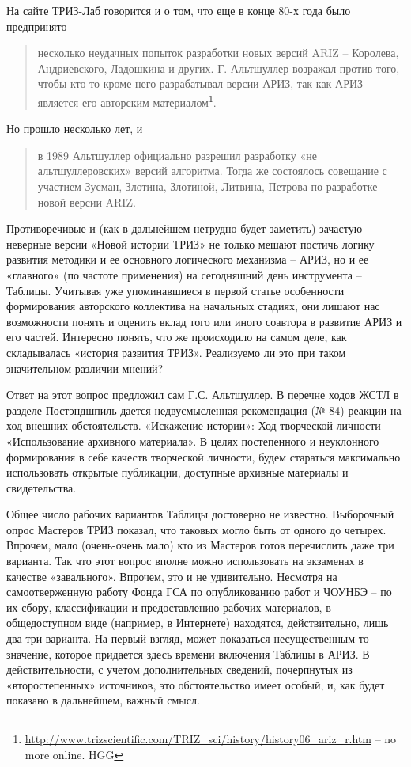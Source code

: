 \documentclass[11pt,a4paper]{article}
\begin{document}
На сайте ТРИЗ-Лаб говорится и о том, что еще в конце 80-х года было
предпринято 
\begin{quote}
  несколько неудачных попыток разработки новых версий ARIZ -- Королева,
  Андриевского, Ладошкина и других. Г. Альтшуллер возражал против того, чтобы
  кто-то кроме него разрабатывал версии АРИЗ, так как АРИЗ является его
  авторским
  материалом\footnote{\url{http://www.trizscientific.com/TRIZ_sci/history/history06_ariz_r.htm}
    -- no more online. HGG}.
\end{quote}
Но прошло несколько лет, и 
\begin{quote}
  в 1989 Альтшуллер официально разрешил разработку «не альтшуллеровских»
  версий алгоритма. Тогда же состоялось совещание с участием Зусман, Злотина,
  Злотиной, Литвина, Петрова по разработке новой версии ARIZ.
\end{quote}

Противоречивые и (как в дальнейшем нетрудно будет заметить) зачастую неверные
версии «Новой истории ТРИЗ» не только мешают постичь логику развития методики
и ее основного логического механизма -- АРИЗ, но и ее «главного» (по частоте
применения) на сегодняшний день инструмента -- Таблицы. Учитывая уже
упоминавшиеся в первой статье особенности формирования авторского коллектива
на начальных стадиях, они лишают нас возможности понять и оценить вклад того
или иного соавтора в развитие АРИЗ и его частей. Интересно понять, что же
происходило на самом деле, как складывалась «история развития ТРИЗ».
Реализуемо ли это при таком значительном различии мнений?

Ответ на этот вопрос предложил сам Г.С. Альтшуллер. В перечне ходов ЖСТЛ
\cite{Altshuller1994} в разделе Постэндшпиль дается недвусмысленная
рекомендация (№ 84) реакции на ход внешних обстоятельств. «Искажение истории»:
Ход творческой личности -- «Использование архивного материала». В целях
постепенного и неуклонного формирования в себе качеств творческой личности,
будем стараться максимально использовать открытые публикации, доступные
архивные материалы и свидетельства.

Общее число рабочих вариантов Таблицы достоверно не известно. Выборочный опрос
Мастеров ТРИЗ показал, что таковых могло быть от одного до четырех. Впрочем,
мало (очень-очень мало) кто из Мастеров готов перечислить даже три варианта.
Так что этот вопрос вполне можно использовать на экзаменах в качестве
«завального». Впрочем, это и не удивительно. Несмотря на самоотверженную
работу Фонда ГСА по опубликованию работ и ЧОУНБЭ -- по их сбору, классификации
и предоставлению рабочих материалов, в общедоступном виде (например, в
Интернете) находятся, действительно, лишь два-три варианта. На первый взгляд,
может показаться несущественным то значение, которое придается здесь времени
включения Таблицы в АРИЗ. В действительности, с учетом дополнительных
сведений, почерпнутых из «второстепенных» источников, это обстоятельство имеет
особый, и, как будет показано в дальнейшем, важный смысл.
\end{document}
